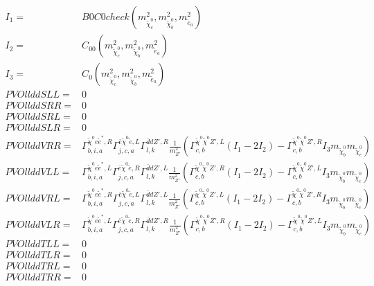 \documentclass[A4,landscape]{article}
\begin{document}
\begin{align} 
I_1= & B0C0check(m^2_{\tilde{\chi}^0_{{c}}}, m^2_{\tilde{\chi}^0_{{b}}}, m^2_{\tilde{e}_{{a}}}) \\ 
I_2= & C_{00}(m^2_{\tilde{\chi}^0_{{c}}}, m^2_{\tilde{\chi}^0_{{b}}}, m^2_{\tilde{e}_{{a}}}) \\ 
I_3= & C_0(m^2_{\tilde{\chi}^0_{{c}}}, m^2_{\tilde{\chi}^0_{{b}}}, m^2_{\tilde{e}_{{a}}}) \\ 
  PVOllddSLL= & 0 \\ 
  PVOllddSRR= & 0 \\ 
  PVOllddSRL= & 0 \\ 
  PVOllddSLR= & 0 \\ 
  PVOllddVRR= &  \Gamma^{\tilde{\chi}^0 e \tilde{e}^*,R}_{b, i, a} \Gamma^{\bar{e}\tilde{\chi}^0 \tilde{e} ,L}_{j, c, a} \Gamma^{\bar{d}d {Z'} ,R}_{l, k} \frac{1}{m^2_{{Z'}}} (\Gamma^{\tilde{\chi}^0 \tilde{\chi}^0 {Z'} ,L}_{c, b} (I_1 - 2 I_2) - \Gamma^{\tilde{\chi}^0 \tilde{\chi}^0 {Z'} ,R}_{c, b} I_3 m_{\tilde{\chi}^0_{{b}}} m_{\tilde{\chi}^0_{{c}}}) \\ 
  PVOllddVLL= &  \Gamma^{\tilde{\chi}^0 e \tilde{e}^*,L}_{b, i, a} \Gamma^{\bar{e}\tilde{\chi}^0 \tilde{e} ,R}_{j, c, a} \Gamma^{\bar{d}d {Z'} ,L}_{l, k} \frac{1}{m^2_{{Z'}}} (\Gamma^{\tilde{\chi}^0 \tilde{\chi}^0 {Z'} ,R}_{c, b} (I_1 - 2 I_2) - \Gamma^{\tilde{\chi}^0 \tilde{\chi}^0 {Z'} ,L}_{c, b} I_3 m_{\tilde{\chi}^0_{{b}}} m_{\tilde{\chi}^0_{{c}}}) \\ 
  PVOllddVRL= &  \Gamma^{\tilde{\chi}^0 e \tilde{e}^*,R}_{b, i, a} \Gamma^{\bar{e}\tilde{\chi}^0 \tilde{e} ,L}_{j, c, a} \Gamma^{\bar{d}d {Z'} ,L}_{l, k} \frac{1}{m^2_{{Z'}}} (\Gamma^{\tilde{\chi}^0 \tilde{\chi}^0 {Z'} ,L}_{c, b} (I_1 - 2 I_2) - \Gamma^{\tilde{\chi}^0 \tilde{\chi}^0 {Z'} ,R}_{c, b} I_3 m_{\tilde{\chi}^0_{{b}}} m_{\tilde{\chi}^0_{{c}}}) \\ 
  PVOllddVLR= &  \Gamma^{\tilde{\chi}^0 e \tilde{e}^*,L}_{b, i, a} \Gamma^{\bar{e}\tilde{\chi}^0 \tilde{e} ,R}_{j, c, a} \Gamma^{\bar{d}d {Z'} ,R}_{l, k} \frac{1}{m^2_{{Z'}}} (\Gamma^{\tilde{\chi}^0 \tilde{\chi}^0 {Z'} ,R}_{c, b} (I_1 - 2 I_2) - \Gamma^{\tilde{\chi}^0 \tilde{\chi}^0 {Z'} ,L}_{c, b} I_3 m_{\tilde{\chi}^0_{{b}}} m_{\tilde{\chi}^0_{{c}}}) \\ 
  PVOllddTLL= & 0 \\ 
  PVOllddTLR= & 0 \\ 
  PVOllddTRL= & 0 \\ 
  PVOllddTRR= & 0 \\ 
\end{align} 
\end{document}

